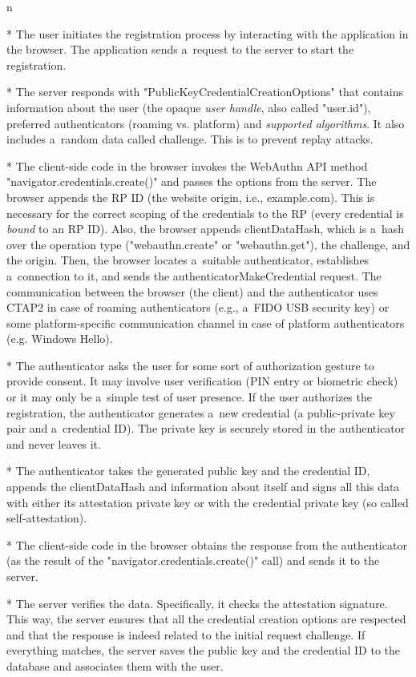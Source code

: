 \begitems \style n 

* The user initiates the registration process by interacting with the application in the browser. The application sends a~request to the server to start the registration.

* The server responds with "PublicKeyCredentialCreationOptions" that contains information about the user (the opaque {\em user handle}, also called "user.id"), preferred authenticators (roaming vs. platform) and {\em supported algorithms}. It also includes a~random data called {\sbf challenge}. This is to prevent replay attacks.

* The client-side code in the browser invokes the WebAuthn API method \nl "navigator.credentials.create()" and passes the options from the server. The browser {\sbf appends the RP ID} (the website origin, i.e., example.com). This is necessary for the {\sbf correct scoping} of the credentials to the RP (every credential is  {\em bound} to an RP ID). Also, the browser appends {\sbf clientDataHash}, which is a~hash over the operation type ("webauthn.create" or "webauthn.get"), the challenge, and the origin. Then, the browser locates a~suitable authenticator, establishes a~connection to it, and sends the authenticatorMakeCredential request. The communication between the browser (the client) and the authenticator uses CTAP2 in case of roaming authenticators (e.g., a~FIDO USB security key) or some platform-specific communication channel in case of platform authenticators (e.g. Windows Hello).

* The authenticator asks the user for some sort of authorization gesture to provide consent. It may involve user verification (PIN entry or biometric check) or it may only be a~simple test of user presence. If the user authorizes the registration, the authenticator {\sbf generates a~new credential} (a public-private key pair and a~credential ID). The private key is securely stored in the authenticator and never leaves it.

* The authenticator takes {\sbf the generated public key} and {\sbf the credential ID}, appends the clientDataHash and information about itself and signs all this data with either its attestation private key or with the credential private key (so called self-attestation).

* The client-side code in the browser obtains the response from the authenticator (as the result of the "navigator.credentials.create()" call) and sends it to the server.

* The server verifies the data. Specifically, it checks the attestation signature. This way, the server ensures that all the credential creation options are respected and that the response is indeed related to the initial request challenge. If everything matches, {\sbf the server saves the public key and the credential ID to the database} and associates them with the user.

